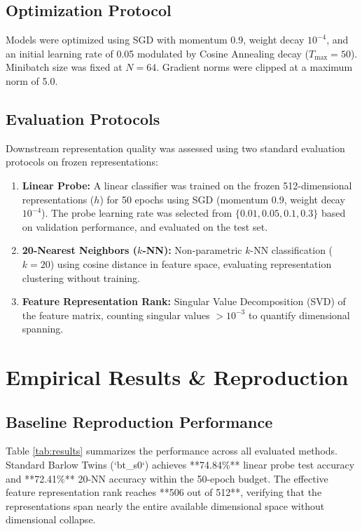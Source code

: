 \documentclass[conference]{IEEEtran}
\begin{document}
\subsection{Optimization Protocol}
Models were optimized using SGD with momentum 0.9, weight decay $10^{-4}$, and an initial learning rate of 0.05 modulated by Cosine Annealing decay ($T_{\max}=50$). Minibatch size was fixed at $N=64$. Gradient norms were clipped at a maximum norm of 5.0.

\subsection{Evaluation Protocols}
Downstream representation quality was assessed using two standard evaluation protocols on frozen representations:
\begin{enumerate}
    \item \textbf{Linear Probe:} A linear classifier was trained on the frozen 512-dimensional representations ($h$) for 50 epochs using SGD (momentum 0.9, weight decay $10^{-4}$). The probe learning rate was selected from $\{0.01, 0.05, 0.1, 0.3\}$ based on validation performance, and evaluated on the test set.
    \item \textbf{20-Nearest Neighbors ($k$-NN):} Non-parametric $k$-NN classification ($k=20$) using cosine distance in feature space, evaluating representation clustering without training.
    \item \textbf{Feature Representation Rank:} Singular Value Decomposition (SVD) of the feature matrix, counting singular values $> 10^{-3}$ to quantify dimensional spanning.
\end{enumerate}

\section{Empirical Results \& Reproduction}

\subsection{Baseline Reproduction Performance}
Table \ref{tab:results} summarizes the performance across all evaluated methods. Standard Barlow Twins (`bt_s0`) achieves **74.84\%** linear probe test accuracy and **72.41\%** 20-NN accuracy within the 50-epoch budget. The effective feature representation rank reaches **506 out of 512**, verifying that the representations span nearly the entire available dimensional space without dimensional collapse.
\end{document}
